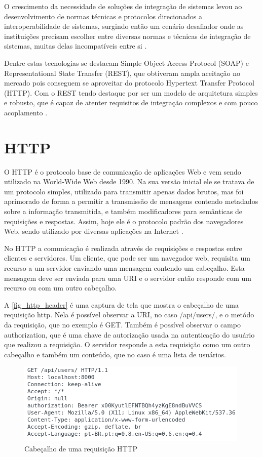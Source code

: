 \documentclass[
	12pt,				%
	openright,			%
	oneside,			%
	a4paper,			%
	english,			%
	french,				%
	spanish,			%
	brazil				%
	]{abntex2}
\begin{document}
O crescimento da necessidade de soluções de integração de sistemas levou ao desenvolvimento de normas técnicas e protocolos direcionados a interoperabilidade de sistemas, surgindo então um cenário desafiador onde as instituições precisam escolher entre diversas normas e técnicas de integração de sistemas, muitas delas incompatíveis entre si \cite{martins2006integraccao}. 

Dentre estas tecnologias se destacam Simple Object Access Protocol (SOAP) e Representational State Transfer (REST), que obtiveram ampla aceitação no mercado pois conseguem se aproveitar do protocolo Hypertext Transfer Protocol (HTTP). Com o REST tendo destaque por ser um modelo de arquitetura simples e robusto, que é capaz de atenter requisitos de integração complexos e com pouco acoplamento \cite{Lusa}.   

\section{HTTP}

O HTTP é o protocolo base de comunicação de aplicações Web e vem sendo utilizado na World-Wide Web desde 1990. Na sua versão inicial ele se tratava de um protocolo simples, utilizado para transmitir apenas dados brutos, mas foi aprimorado de forma a permitir a transmissão de mensagens contendo metadados sobre a informação transmitida, e também modificadores para semânticas de requisições e respostas. Assim, hoje ele é o protocolo padrão dos navegadores Web, sendo utilizado por diversas aplicações na Internet \cite{fielding1999hypertext} . 

No HTTP a comunicação é realizada através de requisições e respostas entre clientes e servidores. Um cliente, que pode ser um navegador web, requisita um recurso a um servidor enviando uma mensagem contendo um cabeçalho. Esta mensagem deve ser enviada para uma URI e o servidor então responde com um recurso ou com um outro cabeçalho. 

A \autoref{fig_http_header} é uma captura de tela que mostra o cabeçalho de uma requisição http. Nela é possível observar a URI, no caso /api/users/, e o metódo da requisição, que no exemplo é GET. Também é possível observar o campo authorization, que é uma chave de autorização usada na autenticação do usuário que realizou a requisição. O servidor responde a esta requisição como um outro cabeçalho e também um conteúdo, que no caso é uma lista de usuários. 

\begin{figure}[htb]
	\caption{\label{fig_http_header} Cabeçalho de uma requisição HTTP}
	\begin{center}
		\includegraphics[scale=0.7]{http_header.png}
	\end{center}
\end{figure}
\end{document}
